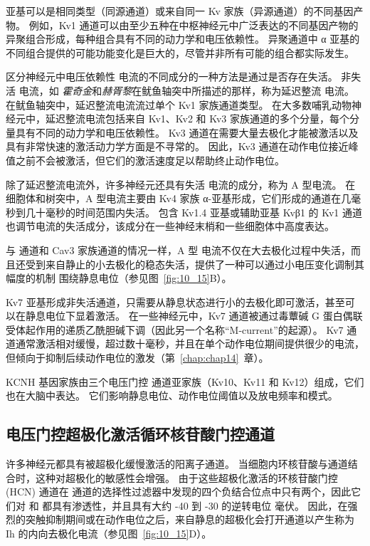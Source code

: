 亚基可以是相同类型（同源通道）或来自同一 Kv 家族（异源通道）的不同基因产物。
例如，Kv1 通道可以由至少五种在中枢神经元中广泛表达的不同基因产物的异聚组合形成，每种组合具有不同的动力学和电压依赖性。
异聚通道中 α 亚基的不同组合提供的可能功能变化是巨大的，尽管并非所有可能的组合都实际发生。


区分神经元中电压依赖性  电流的不同成分的一种方法是通过是否存在失活。
非失活  电流，如 \textit{霍奇金}和\textit{赫胥黎}在鱿鱼轴突中所描述的那样，称为延迟整流  电流。
在鱿鱼轴突中，延迟整流电流流过单个 Kv1 家族通道类型。
在大多数哺乳动物神经元中，延迟整流电流包括来自 Kv1、Kv2 和 Kv3 家族通道的多个分量，每个分量具有不同的动力学和电压依赖性。
Kv3 通道在需要大量去极化才能被激活以及具有非常快速的激活动力学方面是不寻常的。
因此，Kv3 通道在动作电位接近峰值之前不会被激活，但它们的激活速度足以帮助终止动作电位。


除了延迟整流电流外，许多神经元还具有失活  电流的成分，称为 A 型电流。
在细胞体和树突中，A 型电流主要由 Kv4 家族 α-亚基形成，它们形成的通道在几毫秒到几十毫秒的时间范围内失活。
包含 Kv1.4 亚基或辅助亚基 Kvβ1 的 Kv1 通道也调节电流的失活成分，该成分在一些神经末梢和一些细胞体中高度表达。


与  通道和 Cav3 家族通道的情况一样，A 型  电流不仅在大去极化过程中失活，而且还受到来自静止的小去极化的稳态失活，提供了一种可以通过小电压变化调制其幅度的机制 围绕静息电位（参见图~\ref{fig:10_15}B）。

Kv7 亚基形成非失活通道，只需要从静息状态进行小的去极化即可激活，甚至可以在静息电位下显着激活。
在一些神经元中，Kv7 通道被通过毒蕈碱 G 蛋白偶联受体起作用的递质乙酰胆碱下调（因此另一个名称“M-current”的起源）。
Kv7 通道通常激活相对缓慢，超过数十毫秒，并且在单个动作电位期间提供很少的电流，但倾向于抑制后续动作电位的激发（第~\ref{chap:chap14}~章）。


KCNH 基因家族由三个电压门控  通道亚家族（Kv10、Kv11 和 Kv12）组成，它们也在大脑中表达。
它们影响静息电位、动作电位阈值以及放电频率和模式。



\subsection{电压门控超极化激活循环核苷酸门控通道}

许多神经元都具有被超极化缓慢激活的阳离子通道。
当细胞内环核苷酸与通道结合时，这种对超极化的敏感性会增强。
由于这些超极化激活的环核苷酸门控 (HCN) 通道在  通道的选择性过滤器中发现的四个负结合位点中只有两个，因此它们对  和  都具有渗透性，并且具有大约 -40 到 -30 的逆转电位 毫伏。
因此，在强烈的突触抑制期间或在动作电位之后，来自静息的超极化会打开通道以产生称为 Ih 的内向去极化电流（参见图~\ref{fig:10_15}D）。



